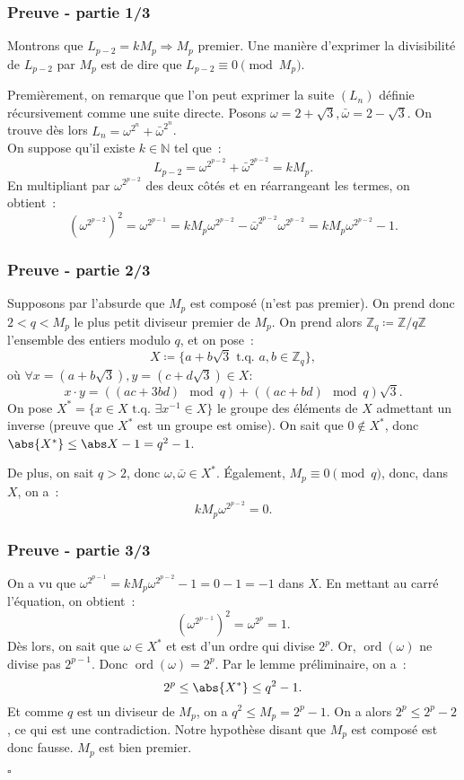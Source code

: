 \documentclass[10pt, mathserif]{beamer}
\DeclareMathOperator{\ord}{ord}
\newcommand{\tq}{\text{ t.q. }}
\newcommand{\Z}{\mathbb Z}
\newcommand{\N}{\mathbb N}
\theoremstyle{definition}
\theoremstyle{remark}
\begin{document}
	\begin{frame}
		\frametitle{Preuve - partie 1/3}

		Montrons que $L_{p-2} = kM_p \Rightarrow M_p$ premier. Une manière d'exprimer la divisibilité de $L_{p-2}$ par $M_p$ est de dire que
		$L_{p-2} \equiv 0 \pmod {M_p}$.

		Premièrement, on remarque que l'on peut exprimer la suite $(L_n)$ définie récursivement comme une suite directe. Posons
		$\omega = 2 + \sqrt 3, \bar \omega = 2 - \sqrt 3$. On trouve dès lors $L_n = \omega^{2^n} + \bar \omega^{2^n}$. \\

		On suppose qu'il existe $k \in \N$ tel que~:
		\[L_{p-2} = \omega^{2^{p-2}} + \bar \omega^{2^{p-2}} = kM_p.\]
		En multipliant par $\omega^{2^{p-2}}$ des deux côtés et en réarrangeant les termes, on obtient~:
		\[\left(\omega^{2^{p-2}}\right)^2 = \omega^{2^{p-1}} = kM_p\omega^{2^{p-2}} - \bar \omega^{2^{p-2}}\omega^{2^{p-2}} = kM_p\omega^{2^{p-2}} - 1.\]
	\end{frame}

	\begin{frame}
		\frametitle{Preuve - partie 2/3}

		Supposons par l'absurde que $M_p$ est composé (n'est pas premier). On prend donc $2 < q < M_p$ le plus petit diviseur premier de $M_p$. On prend
		alors $\Z_q \coloneqq \Z/q\Z$ l'ensemble des entiers modulo $q$, et on pose~:
		\[X \coloneqq \{a + b\sqrt 3 \tq a, b \in \Z_q\},\]
		où $\forall x = (a+b\sqrt 3), y = (c+d\sqrt 3) \in X :$
		\[x \cdot y = \left((ac+3bd) \mod q\right) + \left((ac+bd) \mod q\right)\sqrt 3.\]
		On pose $X^* = \{x \in X \tq \exists x^{-1} \in X\}$ le groupe des éléments de $X$ admettant un inverse (preuve que $X^*$ est un groupe est omise).
		On sait que $0 \not \in X^*$, donc $\abs {X^*} \leq \abs X -1=q^2 - 1$.

		De plus, on sait $q > 2$, donc $\omega, \bar \omega \in X^*$. Également, $M_p \equiv 0 \pmod q$, donc, dans $X$, on a~:
		\[kM_p\omega^{2^{p-2}} = 0.\]
	\end{frame}
	
	\begin{frame}
		\frametitle{Preuve - partie 3/3}

		On a vu que $\omega^{2^{p-1}} = kM_p\omega^{2^{p-2}} - 1 = 0 - 1 = -1$ dans $X$. En mettant au carré l'équation, on obtient~:
		\[\left(\omega^{2^{p-1}}\right)^2 = \omega^{2^p} = 1.\]
		Dès lors, on sait que $\omega \in X^*$ et est d'un ordre qui divise $2^p$. Or, $\ord(\omega)$ ne divise pas $2^{p-1}$. Donc $\ord(\omega) = 2^p$.
		Par le lemme préliminaire, on a~:
		\[2^p \leq \abs {X^*} \leq q^2 - 1.\]
		Et comme $q$ est un diviseur de $M_p$, on a $q^2 \leq M_p = 2^p-1$. On a alors $2^p \leq 2^p - 2$, ce qui est une contradiction. Notre hypothèse disant que
		$M_p$ est composé est donc fausse. $M_p$ est bien premier.
		
		\begin{flushright}$\square$\end{flushright}
	\end{frame}
\end{document}

